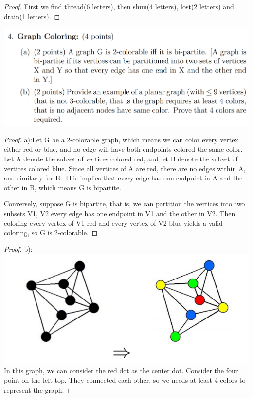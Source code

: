 \documentclass[12pt]{article}
\begin{document}
\begin{proof}
	First we find thread(6 letters), then shun(4 letters), lost(2 letters) and drain(1 letters).
\end{proof}
\includegraphics[scale=0.25]{4.png}
\begin{proof}
	a):Let G be a 2-colorable graph, which means we can color every vertex either red or blue,
	and no edge will have both endpoints colored the same color. Let A denote the subset of vertices
	colored red, and let B denote the subset of vertices colored blue. Since all vertices of A are red, there are no edges within A, and similarly for B. This implies that every edge has one endpoint in A and the other in B, which means G is bipartite.\cite{pdf}
	
	Conversely, suppose G is bipartite, that is, we can partition the vertices into two subsets V1, V2 every edge has one endpoint in V1 and the other in V2. Then coloring every vertex of V1 red and every vertex of V2 blue yields a valid coloring, so G is 2-colorable.
\end{proof}
\begin{proof}
	b): \includegraphics[scale=0.22]{4_2.png} \cite{graph}\\
	In this graph, we can consider the red dot as the center dot. Consider the four point on the left top. They connected each other, so we needs at least 4 colors to represent the graph.
\end{proof}
\end{document}
